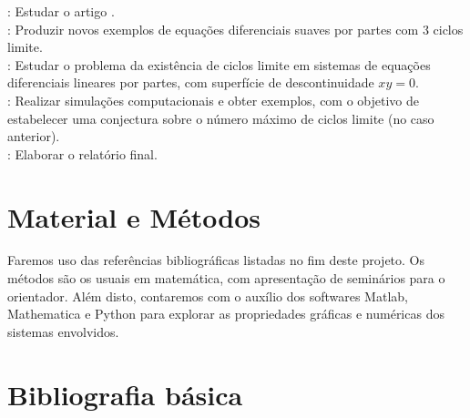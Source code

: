 \documentclass[12pt]{article}
\begin{document}
: Estudar o artigo \cite{jaume1}.\\

: Produzir novos exemplos de equações diferenciais suaves por partes com 3 ciclos limite.\\

: Estudar o problema da existência de ciclos limite em sistemas de equações diferenciais lineares por partes, com superfície de descontinuidade $xy=0$.\\

: Realizar simulações computacionais e obter exemplos, com o objetivo de estabelecer uma conjectura sobre o número máximo de ciclos limite (no caso anterior).\\

: Elaborar o relatório final.

\section{Material e Métodos}

Faremos uso das referências bibliográficas listadas no fim deste projeto. Os métodos são os usuais em matemática, com apresentação de seminários para o orientador. Além disto, contaremos com o auxílio dos softwares Matlab, Mathematica e Python para explorar as propriedades gráficas e numéricas dos sistemas envolvidos.

\section{Bibliografia básica}
\end{document}
